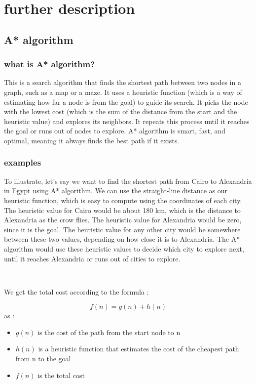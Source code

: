 \documentclass{article}
\begin{document}
\section{further description}
\subsection {A* algorithm}
\subsubsection{what is A* algorithm?}
	This is a search algorithm that finds the shortest path between two nodes in a graph, such as a map or a maze. It uses a heuristic function (which is a way of estimating how far a node is from the goal) to guide its search. It picks the node with the lowest cost (which is the sum of the distance from the start and the heuristic value) and explores its neighbors. It repeats this process until it reaches the goal or runs out of nodes to explore. A* algorithm is smart, fast, and optimal, meaning it always finds the best path if it exists.

\subsubsection{examples}
	To illustrate, let’s say we want to find the shortest path from Cairo to Alexandria in Egypt using A* algorithm. We can use the straight-line distance as our heuristic function, which is easy to compute using the coordinates of each city. The heuristic value for Cairo would be about 180 km, which is the distance to Alexandria as the crow flies. The heuristic value for Alexandria would be zero, since it is the goal. The heuristic value for any other city would be somewhere between these two values, depending on how close it is to Alexandria. The A* algorithm would use these heuristic values to decide which city to explore next, until it reaches Alexandria or runs out of cities to explore.

\\

We get the total cost according to the formula :

\[ f(n) = g(n) + h(n) \]
 as :
    \begin{itemize}
	\item $g(n)$ is the cost of the path from the start node to n
	\item $h(n)$ is a heuristic function that estimates the cost of the cheapest path from n to the goal
    \item $f(n)$ is the total cost
    \end{itemize}
\end{document}
